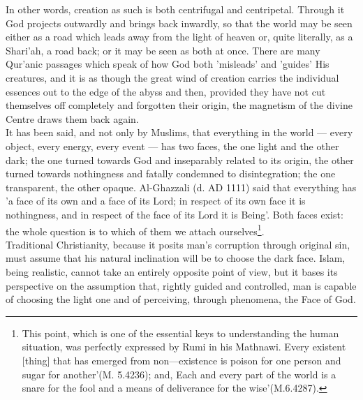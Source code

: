 \documentclass[11pt, b5paper, twoside]{book}
\begin{document}
In other words, creation as such is both centrifugal and centripetal. Through it God projects 
outwardly and brings back inwardly, so that the world may be seen either as a road which leads away 
from the light of heaven or, quite literally, as a Shari'ah, a road back; or it may be seen as both 
at once. There are many Qur'anic passages which speak of how God both 'misleads' and 'guides' His 
creatures, and it is as though the great wind of creation carries the individual essences out to the 
edge of the abyss and then, provided they have not cut themselves off completely and forgotten their 
origin, the magnetism of the divine Centre draws them back again. \\

It has been said, and not only by Muslims, that everything in the world --- every object, every energy, 
every event --- has two faces, the one light and the other dark; the one turned towards God and 
inseparably related to its origin, the other turned towards nothingness and fatally condemned to 
disintegration; the one transparent, the other opaque. Al-Ghazzali (d. AD 1111) said that everything 
has 'a face of its own and a face of its Lord; in respect of its own face it is nothingness, and in 
respect of the face of its Lord it is Being'. Both faces exist: the whole question is to which of 
them we attach ourselves\footnote{This point, which is one of the essential keys to understanding the human situation, was perfectly expressed by Rumi in his Mathnawi. Every existent [thing] that has emerged from non---existence is poison for one person and sugar for another'(M. 5.4236); and, Each and every part of the world is a snare for the fool and a means of deliverance for the wise'(M.6.4287).}.\\

Traditional Christianity, because it posits man's corruption through original sin, must assume that 
his natural inclination will be to choose the dark face. Islam, being realistic, cannot take an 
entirely opposite point of view, but it bases its perspective on the assumption that, rightly guided 
and controlled, man is capable of choosing the light one and of perceiving, through phenomena, the 
Face of God. \\
\end{document}
